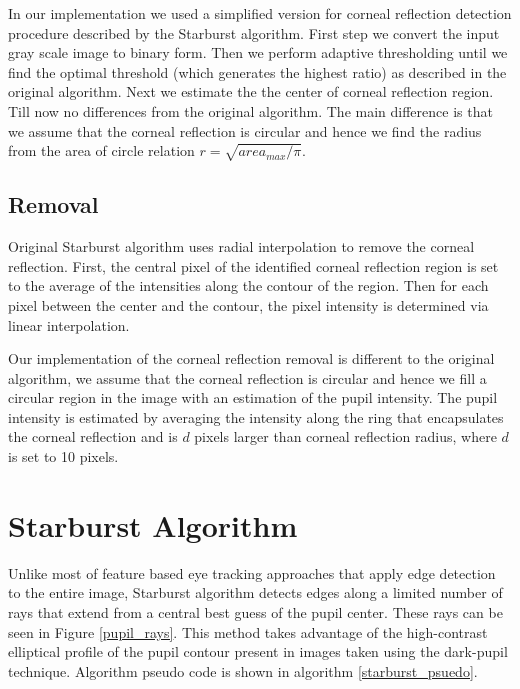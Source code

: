 \documentclass[12pt,fleqn]{book} %
\begin{document}
In our implementation we used a simplified version for corneal reflection detection procedure described by the Starburst algorithm. First step we convert the input gray scale image to binary form. Then we perform adaptive thresholding until we find the optimal threshold (which generates the highest ratio) as described in the original algorithm. Next we estimate the the center of corneal reflection region. Till now no differences from the original algorithm. The main difference is that we assume that the corneal reflection is circular and hence we find the radius from the area of circle relation $r = \sqrt{ area_{max} / \pi }$.

\subsection{Removal}
Original Starburst algorithm uses radial interpolation to remove the corneal reflection. First, the central pixel of the identified corneal reflection region is set to the average of the intensities along the contour of the region. Then for each pixel between the center and the contour, the pixel intensity is determined via linear interpolation. \bigskip

Our implementation of the corneal reflection removal is different to the original algorithm, we assume that the corneal reflection is circular and hence we fill a circular region in the image with an estimation of the pupil intensity. The pupil intensity is estimated by averaging the intensity along the ring that encapsulates the corneal reflection and is $d$ pixels larger than corneal reflection radius, where $d$ is set to 10 pixels.



\section{Starburst Algorithm}

Unlike most of feature based eye tracking approaches that apply edge detection to the entire image, Starburst algorithm detects edges along a limited number of rays that extend from a central best guess of the pupil center. These rays can be seen in Figure \ref{pupil_rays}. This method takes advantage of the high-contrast elliptical profile of the pupil contour present in images taken using the dark-pupil technique. Algorithm pseudo code is shown in algorithm \ref{starburst_psuedo}. \bigskip
\end{document}
